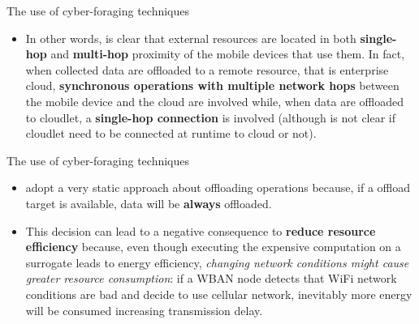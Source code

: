 \documentclass[10pt]{beamer}
\begin{document}
\begin{frame}{The use of cyber-foraging techniques} 

\begin{itemize}

\item In other words, is clear that external resources are located in both \textbf{single-hop} and \textbf{multi-hop} proximity of the mobile devices that use them. In fact, when collected data are offloaded to a remote resource, that is enterprise cloud, \textbf{synchronous operations with multiple network hops} between the mobile device and the cloud are involved while, when data are offloaded to cloudlet, a \textbf{single-hop connection} is involved (although is not clear if cloudlet need to be connected at runtime to cloud or not).

\end{itemize}

\end{frame} 
\begin{frame}{The use of cyber-foraging techniques} 

\begin{itemize}
\item \citet{MSAReport} adopt a very static approach about offloading operations because, if a offload target is available, data will be \textbf{always} offloaded. 

\item This decision can lead to a negative consequence to \textbf{reduce resource efficiency} because, even though executing the expensive computation on a surrogate leads to energy efficiency, \textit{changing network conditions might cause greater resource consumption}: if a WBAN node detects that WiFi network conditions are bad and decide to use cellular network, inevitably more energy will be consumed increasing transmission delay.

\end{itemize}

\end{frame} 
\end{document}
